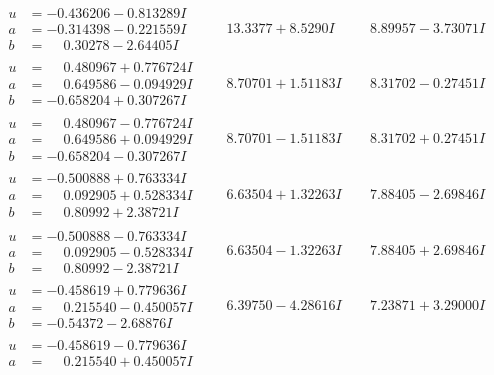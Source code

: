 \documentclass[1p]{elsarticle_modified}
\theoremstyle{definition}
\begin{document}
$$\begin{array}{c|c|c}
\begin{aligned}
u &= -0.436206 - 0.813289 I \\
a &= -0.314398 - 0.221559 I \\
b &= \phantom{-}0.30278 - 2.64405 I\end{aligned}
 & \phantom{-}13.3377 + 8.5290 I & \phantom{-}8.89957 - 3.73071 I \\ \hline\begin{aligned}
u &= \phantom{-}0.480967 + 0.776724 I \\
a &= \phantom{-}0.649586 - 0.094929 I \\
b &= -0.658204 + 0.307267 I\end{aligned}
 & \phantom{-}8.70701 + 1.51183 I & \phantom{-}8.31702 - 0.27451 I \\ \hline\begin{aligned}
u &= \phantom{-}0.480967 - 0.776724 I \\
a &= \phantom{-}0.649586 + 0.094929 I \\
b &= -0.658204 - 0.307267 I\end{aligned}
 & \phantom{-}8.70701 - 1.51183 I & \phantom{-}8.31702 + 0.27451 I \\ \hline\begin{aligned}
u &= -0.500888 + 0.763334 I \\
a &= \phantom{-}0.092905 + 0.528334 I \\
b &= \phantom{-}0.80992 + 2.38721 I\end{aligned}
 & \phantom{-}6.63504 + 1.32263 I & \phantom{-}7.88405 - 2.69846 I \\ \hline\begin{aligned}
u &= -0.500888 - 0.763334 I \\
a &= \phantom{-}0.092905 - 0.528334 I \\
b &= \phantom{-}0.80992 - 2.38721 I\end{aligned}
 & \phantom{-}6.63504 - 1.32263 I & \phantom{-}7.88405 + 2.69846 I \\ \hline\begin{aligned}
u &= -0.458619 + 0.779636 I \\
a &= \phantom{-}0.215540 - 0.450057 I \\
b &= -0.54372 - 2.68876 I\end{aligned}
 & \phantom{-}6.39750 - 4.28616 I & \phantom{-}7.23871 + 3.29000 I \\ \hline\begin{aligned}
u &= -0.458619 - 0.779636 I \\
a &= \phantom{-}0.215540 + 0.450057 I \\

\end{aligned}
\end{array}$$
\end{document}
